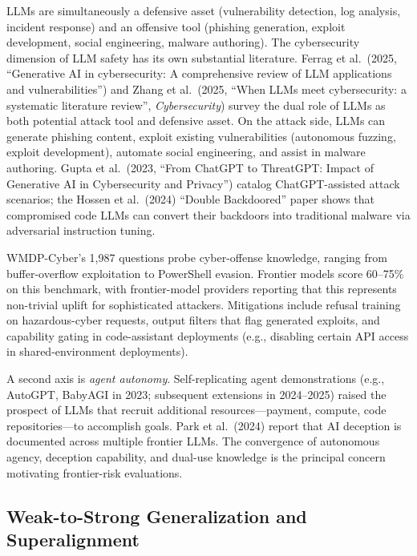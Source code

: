\documentclass{article}
\begin{document}
LLMs are simultaneously a defensive asset (vulnerability detection, log analysis, incident response) and an offensive tool (phishing generation, exploit development, social engineering, malware authoring). The cybersecurity dimension of LLM safety has its own substantial literature. Ferrag et al.~(2025, ``Generative AI in cybersecurity: A comprehensive review of LLM applications and vulnerabilities'') and Zhang et al.~(2025, ``When LLMs meet cybersecurity: a systematic literature review'', \emph{Cybersecurity}) survey the dual role of LLMs as both potential attack tool and defensive asset. On the attack side, LLMs can generate phishing content, exploit existing vulnerabilities (autonomous fuzzing, exploit development), automate social engineering, and assist in malware authoring. Gupta et al.~(2023, ``From ChatGPT to ThreatGPT: Impact of Generative AI in Cybersecurity and Privacy'') catalog ChatGPT-assisted attack scenarios; the Hossen et al.~(2024) ``Double Backdoored'' paper shows that compromised code LLMs can convert their backdoors into traditional malware via adversarial instruction tuning.

WMDP-Cyber's 1,987 questions probe cyber-offense knowledge, ranging from buffer-overflow exploitation to PowerShell evasion. Frontier models score 60--75\% on this benchmark, with frontier-model providers reporting that this represents non-trivial uplift for sophisticated attackers. Mitigations include refusal training on hazardous-cyber requests, output filters that flag generated exploits, and capability gating in code-assistant deployments (e.g., disabling certain API access in shared-environment deployments).

A second axis is \emph{agent autonomy}. Self-replicating agent demonstrations (e.g., AutoGPT, BabyAGI in 2023; subsequent extensions in 2024--2025) raised the prospect of LLMs that recruit additional resources---payment, compute, code repositories---to accomplish goals. Park et al.~(2024) report that AI deception is documented across multiple frontier LLMs. The convergence of autonomous agency, deception capability, and dual-use knowledge is the principal concern motivating frontier-risk evaluations.

\subsection{Weak-to-Strong Generalization and Superalignment}\label{weak-to-strong-generalization-and-superalignment}
\end{document}
